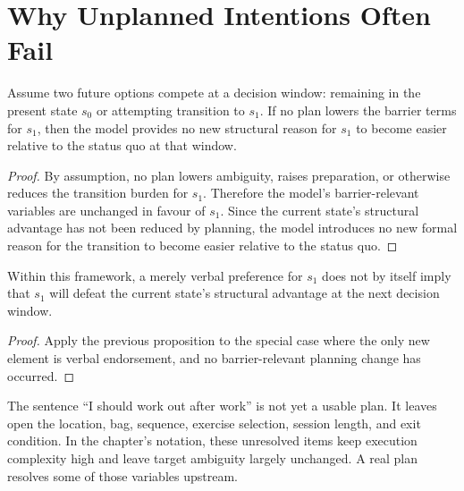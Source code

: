 \section{Why Unplanned Intentions Often Fail}

\begin{proposition}
Assume two future options compete at a decision window: remaining in the
present state $s_0$ or attempting transition to $s_1$. If no plan lowers the
barrier terms for $s_1$, then the model provides no new structural reason for
$s_1$ to become easier relative to the status quo at that window.
\end{proposition}

\begin{proof}
By assumption, no plan lowers ambiguity, raises preparation, or otherwise
reduces the transition burden for $s_1$. Therefore the model's barrier-relevant
variables are unchanged in favour of $s_1$. Since the current state's
structural advantage has not been reduced by planning, the model introduces no
new formal reason for the transition to become easier relative to the status
quo.
\end{proof}

\begin{corollary}
Within this framework, a merely verbal preference for $s_1$ does not by itself
imply that $s_1$ will defeat the current state's structural advantage at the
next decision window.
\end{corollary}

\begin{proof}
Apply the previous proposition to the special case where the only new element
is verbal endorsement, and no barrier-relevant planning change has occurred.
\end{proof}

\begin{example}
The sentence ``I should work out after work'' is not yet a usable plan. It
leaves open the location, bag, sequence, exercise selection, session length,
and exit condition. In the chapter's notation, these unresolved items keep
execution complexity high and leave target ambiguity largely unchanged. A real
plan resolves some of those variables upstream.
\end{example}
